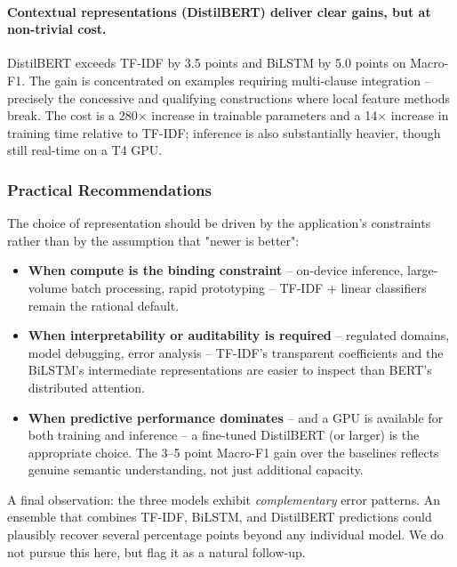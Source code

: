 \documentclass[11pt,a4paper]{article}
\begin{document}
\paragraph{Contextual representations (DistilBERT) deliver clear gains, but at non-trivial cost.} DistilBERT exceeds TF-IDF by 3.5 points and BiLSTM by 5.0 points on Macro-F1. The gain is concentrated on examples requiring multi-clause integration -- precisely the concessive and qualifying constructions where local feature methods break. The cost is a 280$\times$ increase in trainable parameters and a 14$\times$ increase in training time relative to TF-IDF; inference is also substantially heavier, though still real-time on a T4 GPU.

\subsubsection{Practical Recommendations}

The choice of representation should be driven by the application's constraints rather than by the assumption that "newer is better":

\begin{itemize}[noitemsep,leftmargin=*]
    \item \textbf{When compute is the binding constraint} -- on-device inference, large-volume batch processing, rapid prototyping -- TF-IDF + linear classifiers remain the rational default.
    \item \textbf{When interpretability or auditability is required} -- regulated domains, model debugging, error analysis -- TF-IDF's transparent coefficients and the BiLSTM's intermediate representations are easier to inspect than BERT's distributed attention.
    \item \textbf{When predictive performance dominates} -- and a GPU is available for both training and inference -- a fine-tuned DistilBERT (or larger) is the appropriate choice. The 3--5 point Macro-F1 gain over the baselines reflects genuine semantic understanding, not just additional capacity.
\end{itemize}

A final observation: the three models exhibit \emph{complementary} error patterns. An ensemble that combines TF-IDF, BiLSTM, and DistilBERT predictions could plausibly recover several percentage points beyond any individual model. We do not pursue this here, but flag it as a natural follow-up.

\end{document}
